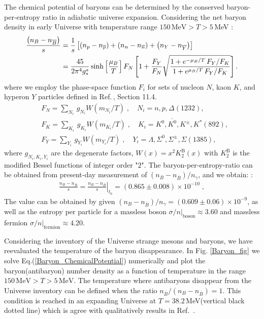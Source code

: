 \documentclass[universe,article,submit,moreauthors,pdftex,a4paper]{Definitions/mdpi}
\begin{document}
The chemical potential of baryons can be determined by the conserved baryon-per-entropy ratio in adiabatic universe expansion. Considering the net baryon density in early Universe with temperature range $150\,\mathrm{MeV}>T>5$\,MeV \cite{Yang:2021bko}:
\begin{align}\label{Baryon_ChemicalPotential}
\frac{\left(n_B-n_{\overline{B}}\right)}{s}&=\frac{1}{s}\left[\left(n_p-n_{\overline{p}}\right)+\left(n_n-n_{\overline{n}}\right)+\left(n_Y-n_{\overline{Y}}\right)\right]\notag\\
&=\frac{45}{2\pi^4g^s_\ast}\sinh\left[\frac{\mu_B}{T}\right]F_N\left[1+\frac{F_Y}{F_N}\sqrt{\frac{1+e^{-\mu_B/T}\,F_Y/F_K}{1+e^{\mu_B/T}\,F_Y/F_K}}\right].
\end{align}
where we employ the phase-space function $F_i$ for sets of nucleon $N$, kaon $K$, and hyperon $Y$ particles defined in Ref.\,\cite{Letessier:2002gp}, Section 11.4.
\begin{align}
&F_N=\sum_{N_i}\,g_{N_i}W(m_{N_i}/T)\;, \quad N_i=n, p, \Delta(1232),\\
&F_K=\sum_{K_i}\,g_{K_i}W(m_{K_i}/T)\;, \quad K_i=K^0, \overline{K^0}, K^\pm, K^\ast(892),\\
&F_Y=\sum_{Y_i}\,g_{Y_i}W(m_{Y_i}/T)\;, \quad Y_i=\Lambda, \Sigma^0,\Sigma^\pm, \Sigma(1385),
\end{align}
where $g_{N_i,K_i,Y_i}$ are the degenerate factors, $W(x)=x^2K^\mathrm{B}_2(x)$ with $K^\mathrm{B}_2$ is the modified Bessel functions of integer order "$2$". The baryon-per-entropy-ratio can be obtained from present-day measurement of $\left(n_B-n_{\overline{B}}\right)/n_\gamma$, and we obtain: \cite{Yang:2021bko}:
\begin{align}\label{BdS}
\frac{n_B-n_{\overline{B}}}{s}= \left.\frac{n_B-n_{\overline{B}}}{s}\right|_{t_0}=(0.865\pm0.008)\times10^{-10} \;,
\end{align}
The value can be obtained by given $\left(n_B-n_{\overline{B}}\right)/n_\gamma= (0.609\pm0.06)\times10^{-9}$, as well as the entropy per particle for a massless boson $\sigma/n|_\mathrm{boson}\approx 3.60$ and massless fermion $\sigma/n|_\mathrm{fermion}\approx 4.20$.

 Considering the inventory of the Universe strange mesons and baryons, we have reevaluated the temperature of the baryon disappearance.
In Fig. \ref{Baryon_fig} we solve Eq.(\ref{Baryon_ChemicalPotential}) numerically and plot the baryon(antibaryon) number density as a function of temperature in the range $150\,\mathrm{MeV}>T>5\,\mathrm{MeV}$. The temperature where antibaryons disappear from the Universe inventory can be defined when the ratio $n_{\overline B}/(n_B-n_{\overline B})=1$. This condition is reached in an expanding Universe at $T=38.2$\,MeV(vertical black dotted line) which is agree with qualitatively results in Ref.\,\cite{Kolb:1990vq} . 
\end{document}
